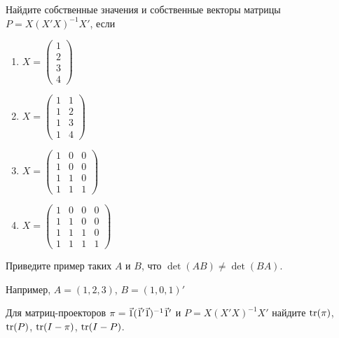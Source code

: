 \documentclass[pdftex,11pt,openany]{book}\usepackage[]{graphicx}\usepackage[]{color}
\begin{document}
\begin{solution}
\end{solution}


\begin{problem}
Найдите собственные значения и собственные векторы матрицы $P = X(X'X)^{-1}X'$, если 

\begin{enumerate}

\item $X = \begin{pmatrix} 1 \\ 2 \\ 3 \\ 4 \end{pmatrix}$

\item $X = \begin{pmatrix} 1 & 1 \\ 1 & 2 \\ 1 & 3 \\ 1 & 4 \end{pmatrix}$

\item $X = \begin{pmatrix} 1 & 0 & 0 \\ 1 & 0 & 0 \\ 1 & 1 & 0  \\ 1 & 1 & 1 \end{pmatrix}$

\item $X = \begin{pmatrix} 1 & 0 & 0 & 0 \\ 1 & 1 & 0 & 0 \\ 1 & 1 & 1 & 0  \\ 1 & 1 & 1 & 1 \end{pmatrix}$
\end{enumerate}
\end{problem}

\begin{solution}
\end{solution}

\begin{problem}
Приведите пример таких $A$ и $B$, что $\det(AB)\neq \det(BA)$.
\end{problem}

\begin{solution}
Например, $A=(1,2,3)$, $B=(1,0,1)'$
\end{solution}

\begin{problem}
Для матриц-проекторов $\pi=\v1(\v1'\v1)^{-1}\v1'$ и $P=X(X'X)^{-1}X'$ найдите $\operatorname{tr}(\pi)$, $\operatorname{tr}(P)$, $\operatorname{tr}(I-\pi)$, $\operatorname{tr}(I-P)$.
\end{problem}
\end{document}

